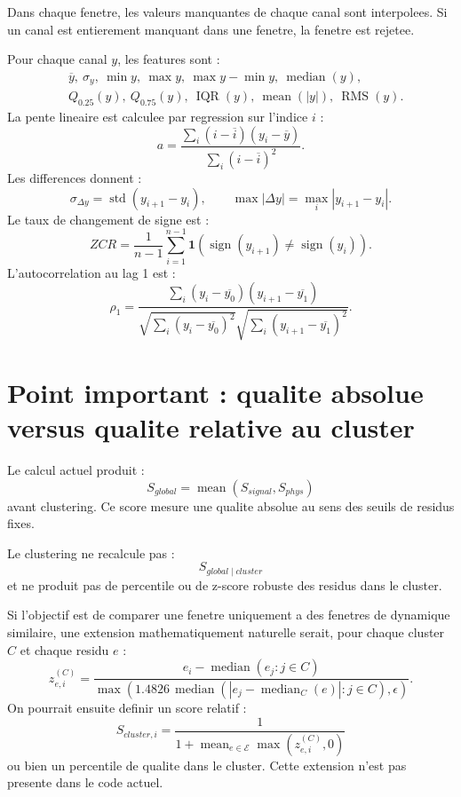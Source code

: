 \documentclass[11pt,a4paper]{article}
\newcommand{\RMS}{\operatorname{RMS}}
\newcommand{\median}{\operatorname{median}}
\newcommand{\IQR}{\operatorname{IQR}}
\begin{document}
Dans chaque fenetre, les valeurs manquantes de chaque canal sont interpolees. Si un canal est entierement manquant dans une fenetre, la fenetre est rejetee.

Pour chaque canal $y$, les features sont :
\[
\begin{aligned}
&\overline{y},\ \sigma_y,\ \min y,\ \max y,\ \max y-\min y,\ \median(y),\\
&Q_{0.25}(y),\ Q_{0.75}(y),\ \IQR(y),\ \operatorname{mean}(|y|),\ \RMS(y).
\end{aligned}
\]
La pente lineaire est calculee par regression sur l'indice $i$ :
\[
  a=\frac{\sum_i (i-\overline{i})(y_i-\overline{y})}{\sum_i(i-\overline{i})^2}.
\]
Les differences donnent :
\[
  \sigma_{\Delta y}=\operatorname{std}(y_{i+1}-y_i),
  \qquad
  \max|\Delta y|=\max_i |y_{i+1}-y_i|.
\]
Le taux de changement de signe est :
\[
  ZCR=\frac{1}{n-1}\sum_{i=1}^{n-1}\mathbf{1}(\operatorname{sign}(y_{i+1})\ne \operatorname{sign}(y_i)).
\]
L'autocorrelation au lag 1 est :
\[
  \rho_1=
  \frac{\sum_i (y_i-\overline{y_0})(y_{i+1}-\overline{y_1})}
       {\sqrt{\sum_i(y_i-\overline{y_0})^2}\sqrt{\sum_i(y_{i+1}-\overline{y_1})^2}}.
\]

\section{Point important : qualite absolue versus qualite relative au cluster}

Le calcul actuel produit :
\[
  S_{global}=\operatorname{mean}(S_{signal},S_{phys})
\]
avant clustering. Ce score mesure une qualite absolue au sens des seuils de residus fixes.

Le clustering ne recalcule pas :
\[
  S_{global\mid cluster}
\]
et ne produit pas de percentile ou de z-score robuste des residus dans le cluster.

Si l'objectif est de comparer une fenetre uniquement a des fenetres de dynamique similaire, une extension mathematiquement naturelle serait, pour chaque cluster $C$ et chaque residu $e$ :
\[
  z_{e,i}^{(C)}=
  \frac{e_i-\median(e_j:j\in C)}
       {\max(1.4826\,\median(|e_j-\median_C(e)|:j\in C),\epsilon)}.
\]
On pourrait ensuite definir un score relatif :
\[
  S_{cluster,i}
  =
  \frac{1}{1+\operatorname{mean}_{e\in\mathcal{E}} \max(z_{e,i}^{(C)},0)}
\]
ou bien un percentile de qualite dans le cluster. Cette extension n'est pas presente dans le code actuel.
\end{document}
